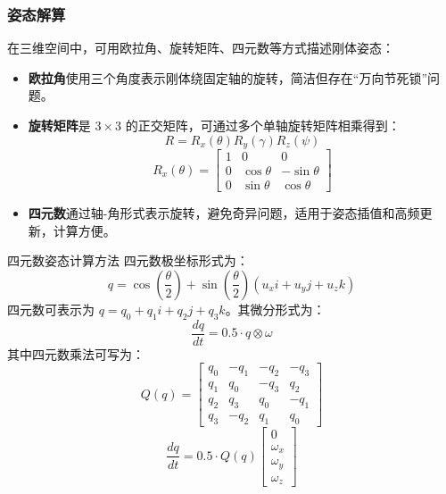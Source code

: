 \documentclass{beamer}
\begin{document}
	
	\begin{frame}
		\frametitle{姿态解算}

		在三维空间中，可用欧拉角、旋转矩阵、四元数等方式描述刚体姿态：
		
		\begin{itemize}
			\item \textbf{欧拉角}使用三个角度表示刚体绕固定轴的旋转，简洁但存在“万向节死锁”问题。
			\item \textbf{旋转矩阵}是 $3 \times 3$ 的正交矩阵，可通过多个单轴旋转矩阵相乘得到：
			\[
			R = R_x(\theta) R_y(\gamma) R_z(\psi)
			\]
			\[
			R_x(\theta) = \begin{bmatrix}1 & 0 & 0 \\ 0 & \cos\theta & -\sin\theta \\ 0 & \sin\theta & \cos\theta\end{bmatrix}
			\]
			\item \textbf{四元数}通过轴-角形式表示旋转，避免奇异问题，适用于姿态插值和高频更新，计算方便。
		\end{itemize}
	\end{frame}
	
	\begin{frame}{四元数姿态计算方法}
		\small
		四元数极坐标形式为：
		\[
		q = \cos\left(\frac{\theta}{2}\right) + \sin\left(\frac{\theta}{2}\right)(u_x i + u_y j + u_z k)
		\]
		四元数可表示为 $q = q_0 + q_1 i + q_2 j + q_3 k$。其微分形式为：
		\[
		\frac{dq}{dt} = 0.5 \cdot q \otimes \omega
		\]
		其中四元数乘法可写为：
		\[
		Q(q) = \begin{bmatrix}
			q_0 & -q_1 & -q_2 & -q_3 \\
			q_1 & q_0 & -q_3 & q_2 \\
			q_2 & q_3 & q_0 & -q_1 \\
			q_3 & -q_2 & q_1 & q_0
		\end{bmatrix}
		\]
		\[
		\frac{dq}{dt} = 0.5 \cdot Q(q) \begin{bmatrix}0 \\ \omega_x \\ \omega_y \\ \omega_z\end{bmatrix}
		\]
	\end{frame}
	
\end{document}
